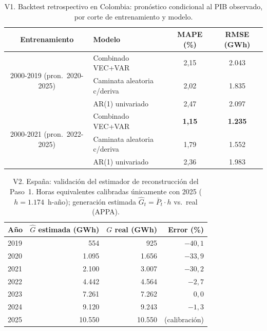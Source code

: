 \begin{table}[H]\centering\small
\caption{V1. Backtest retrospectivo en Colombia: pronóstico condicional al
PIB observado, por corte de entrenamiento y modelo.}
\begin{tabular}{clcc}
\toprule
Entrenamiento & Modelo & MAPE (\%) & RMSE (GWh)\\
\midrule
\multirow{3}{*}{2000-2019 (pron.\ 2020-2025)}
 & Combinado VEC+VAR & 2,15 & 2.043\\
 & Caminata aleatoria c/deriva & 2,02 & 1.835\\
 & AR(1) univariado & 2,47 & 2.097\\
\midrule
\multirow{3}{*}{2000-2021 (pron.\ 2022-2025)}
 & Combinado VEC+VAR & \textbf{1,15} & \textbf{1.235}\\
 & Caminata aleatoria c/deriva & 1,79 & 1.552\\
 & AR(1) univariado & 2,36 & 1.983\\
\bottomrule
\end{tabular}
\end{table}

\begin{table}[H]\centering\small
\caption{V2. España: validación del estimador de reconstrucción del
Paso~1. Horas equivalentes calibradas únicamente con 2025
($h=1.174$~h-año); generación estimada
$\widehat{G}_t=\bar{P}_t\cdot h$ vs.\ real (APPA).}
\begin{tabular}{lrrr}
\toprule
Año & $\widehat{G}$ estimada (GWh) & $G$ real (GWh) & Error (\%)\\
\midrule
2019 & 554   & 925    & $-40{,}1$\\
2020 & 1.095 & 1.656  & $-33{,}9$\\
2021 & 2.100 & 3.007  & $-30{,}2$\\
2022 & 4.442 & 4.564  & $-2{,}7$\\
2023 & 7.261 & 7.262  & $0{,}0$\\
2024 & 9.120 & 9.243  & $-1{,}3$\\
2025 & 10.550 & 10.550 & (calibración)\\
\bottomrule
\end{tabular}
\end{table}

